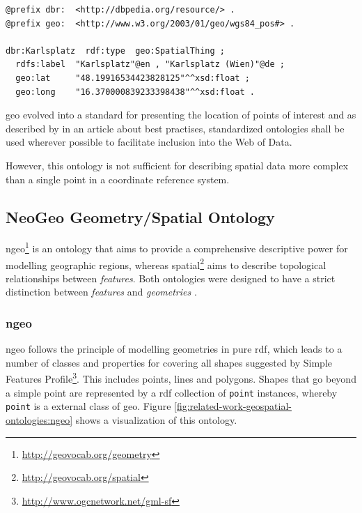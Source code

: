 \documentclass[draft,final]{vutinfth} %
\begin{document}
\begin{lstlisting}[frame=single, caption=Snippet of DBpedia, label={lst:related-work-geospatial-ontologies:wgs84-dbpedia}]
@prefix dbr:  <http://dbpedia.org/resource/> .
@prefix geo:  <http://www.w3.org/2003/01/geo/wgs84_pos#> .

dbr:Karlsplatz  rdf:type  geo:SpatialThing ;
  rdfs:label  "Karlsplatz"@en , "Karlsplatz (Wien)"@de ;
  geo:lat     "48.19916534423828125"^^xsd:float ;
  geo:long    "16.370000839233398438"^^xsd:float .
\end{lstlisting}

\gls{geo} evolved into a standard for presenting the location of points of interest and as described by \cite{hyland_best_2014} in an article about best practises, standardized ontologies shall be used wherever possible to facilitate
inclusion into the Web of Data.

However, this ontology is not sufficient for describing spatial data more complex than a single point in a coordinate reference system.

\subsection{NeoGeo Geometry/Spatial Ontology}
\gls{ngeo}\footnote{\url{http://geovocab.org/geometry}} is an ontology that aims to provide a comprehensive descriptive power for modelling geographic regions, whereas \gls{spatial}\footnote{\url{http://geovocab.org/spatial}} aims to describe topological relationships between \textit{features}. Both ontologies were designed to have a strict distinction between \textit{features} and \textit{geometries} \cite{norton_neogeo_2012}.

\subsubsection{\gls{ngeo}} 
\gls{ngeo} follows the principle of modelling geometries in pure \gls{rdf}, which leads to a number of classes and properties for covering all shapes suggested by Simple Features Profile\footnote{\url{http://www.ogcnetwork.net/gml-sf}}. This includes points, lines and polygons. Shapes that go beyond a simple point are represented by a \gls{rdf} collection of \texttt{point} instances, whereby \texttt{point} is a external class of \gls{geo}. Figure \ref{fig:related-work-geospatial-ontologies:ngeo} shows a visualization of this ontology.
\end{document}
